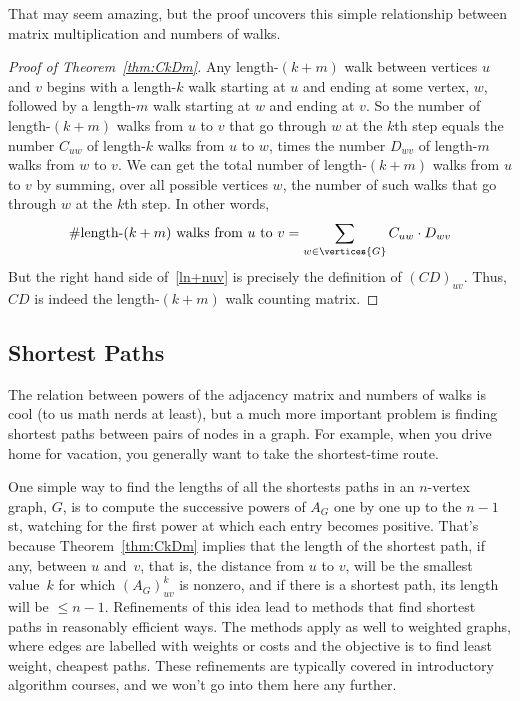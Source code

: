 That may seem amazing, but the proof uncovers this simple relationship
between matrix multiplication and numbers of walks.

\begin{editingnotes}
\end{editingnotes}

\begin{proof}[Proof of Theorem~\ref{thm:CkDm}]
  Any length-$(k+m)$ walk between vertices $u$ and $v$ begins with a
  length-$k$ walk starting at $u$ and ending at some vertex, $w$,
  followed by a length-$m$ walk starting at $w$ and ending at $v$.  So
  the number of length-$(k+m)$ walks from $u$ to $v$ that go through
  $w$ at the $k$th step equals the number $C_{uw}$ of length-$k$ walks
  from $u$ to $w$, times the number $D_{wv}$ of length-$m$ walks from
  $w$ to $v$.  We can get the total number of length-$(k+m)$ walks
  from $u$ to $v$ by summing, over all possible vertices $w$, the
  number of such walks that go through $w$ at the $k$th step.  In
  other words,
\begin{equation}\label{ln+nuv}
\text{\#length-$(k+m)$ walks from $u$ to $v$} =
              \sum_{w \in \vertices{G}} C_{uw}\cdot D_{wv}
\end{equation}
But the right hand side of~\eqref{ln+nuv} is precisely the definition of
$(CD)_{uv}$.  Thus, $CD$ is indeed the length-$(k+m)$ walk counting matrix.
\end{proof}


\subsection{Shortest Paths}
The relation between powers of the adjacency matrix and numbers of
walks is cool (to us math nerds at least), but a much more important
problem is finding  shortest paths between
pairs of nodes in a graph.  For example, when you drive home for
vacation, you generally want to take the shortest-time route.  

One simple way to find the lengths of all the shortests paths in an
$n$-vertex graph, $G$, is to compute the successive powers of $A_G$
one by one up to the $n-1$st, watching for the first power at which
each entry becomes positive.  That's because Theorem~\ref{thm:CkDm}
implies that the length of the shortest path, if any, between $u$
and~$v$, that is, the distance from $u$ to $v$, will be the smallest
value~$k$ for which $(A_G)_{uv}^k$ is nonzero, and if there is a
shortest path, its length will be $\leq n-1$.  Refinements of this
idea lead to methods that find shortest paths in reasonably efficient
ways.  The methods apply as well to weighted graphs, where edges are
labelled with weights or costs and the objective is to find least
weight, cheapest paths.  These refinements are typically covered in
introductory algorithm courses, and we won't go into them here any
further.

